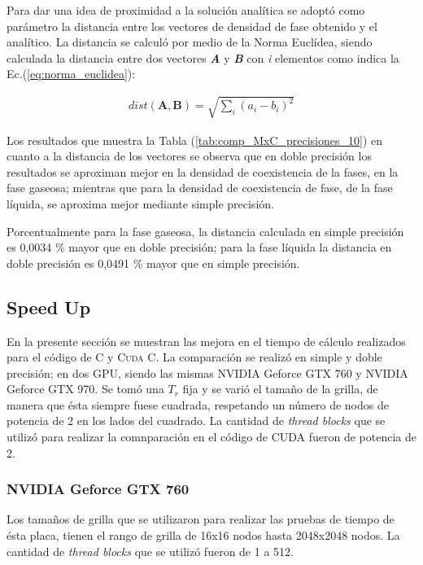 Para dar una idea de proximidad a la solución analítica se adoptó como parámetro la distancia entre los vectores de densidad de fase obtenido y el analítico. La distancia se calculó por medio de la Norma Euclídea, siendo calculada la distancia entre dos vectores \textbf{\textit{A}} y \textbf{\textit{B}} con \textit{i} elementos como indica la Ec.(\ref{eq:norma_euclidea}):

\begin{align}
dist(\mathbf{A},\mathbf{B}) = \sqrt{\sum_i {\left( a_i - b_i \right)}^2  }
\label{eq:norma_euclidea}
\end{align}

Los resultados que muestra la Tabla (\ref{tab:comp_MxC_precisiones_10}) en cuanto a la distancia de los vectores se observa que en doble precisión los resultados se aproximan mejor en la densidad de coexistencia de la fases, en la fase gaseosa; mientras que para la densidad de coexistencia de fase, de la fase líquida, se aproxima mejor mediante simple precisión. 

Porcentualmente para la fase gaseosa, la distancia calculada en simple precisión es 0,0034 \% mayor que en doble precisión; para la fase líquida la distancia en doble precisión es 0,0491 \% mayor que en simple precisión.




\newpage

\subsection{Speed Up}

En la presente sección se muestran las mejora en el tiempo de cálculo realizados para el código de \textsc{C} y \textsc{Cuda C}. La comparación se realizó en simple y doble precisión; en dos GPU, siendo las mismas NVIDIA Geforce GTX 760 y NVIDIA Geforce GTX 970. Se tomó una $T_r$ fija y se varió el tamaño de la grilla, de manera que ésta siempre fuese cuadrada, respetando un número de nodos de potencia de 2 en los lados del cuadrado. La cantidad de \textit{thread blocks} que se utilizó para realizar la comnparación en el código de \textsc{CUDA} fueron de potencia de 2.

\subsubsection{NVIDIA Geforce GTX 760}

Los tamaños de grilla que se utilizaron para realizar las pruebas de tiempo de ésta placa, tienen el rango de grilla de 16x16 nodos hasta 2048x2048 nodos. La cantidad de \textit{thread blocks} que se utilizó fueron de 1 a 512.

